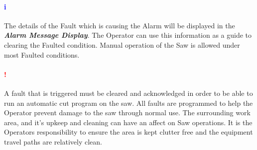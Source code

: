 \paragraph*{\textbf{\LARGE \textcolor{blue}{i}}}The details of the Fault which is causing the Alarm will be displayed in the \textbf{\textit{Alarm Message Display}}. The Operator can use this information as a guide to clearing the Faulted condition. Manual operation of the Saw is allowed under most Faulted conditions.
\paragraph*{\textbf{{\LARGE \textcolor{red}{!}}}}A fault that is triggered must be cleared and acknowledged in order to be able to run an automatic cut program on the saw. All faults are programmed to help the Operator prevent damage to the saw through normal use. The surrounding work area, and it's upkeep and cleaning can have an affect on Saw operations. It is the Operators responsibility to ensure the area is kept clutter free and the equipment travel paths are relatively clean.
